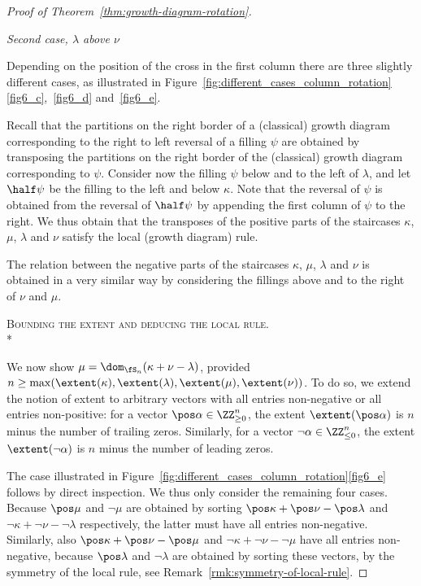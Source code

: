 \begin{proof}[Proof of Theorem~\ref{thm:growth-diagram-rotation}]
\begin{enonce*}[remark]{\emph{Second case, $\lambda$ above $\nu$}}\ 

 Depending on the position of the cross in the first column there
 are three slightly different cases, as illustrated in
 Figure~\ref{fig:different_cases_column_rotation}\ref{fig6_c},~\ref{fig6_d} and~\ref{fig6_e}.

 Recall that the partitions on the right border of a (classical)
 growth diagram corresponding to the right to left reversal of a
 filling $\psi$ are obtained by transposing the partitions on the
 right border of the (classical) growth diagram corresponding to
 $\psi$. Consider now the filling $\psi$ below and to the left of
 $\lambda$, and let $\half\psi$ be the filling to the left and below
 $\kappa$. Note that the reversal of $\psi$ is obtained from the
 reversal of $\half\psi$ by appending the first column of $\psi$ to
 the right. We thus obtain that the transposes of the positive
 parts of the staircases $\kappa$, $\mu$, $\lambda$ and $\nu$
 satisfy the local (growth diagram) rule.

 The relation between the negative parts of the staircases $\kappa$,
 $\mu$, $\lambda$ and $\nu$ is obtained in a very similar way by
 considering the fillings above and to the right of $\nu$ and $\mu$.
\end{enonce*}

\noindent
\textsc{Bounding the extent and deducing the local rule.}\\*\vspace*{-1.1em}

 We now show
 $\mu = \dom_{\fS_n}(\kappa+\nu-\lambda)$, provided
 $n\geq\max(\extent(\kappa),\extent(\lambda),\extent(\mu),\extent(\nu))$.
 To do so, we extend the notion of extent to arbitrary vectors with
 all entries non-negative or all entries non-positive: for a vector
 $\pos\alpha\in\ZZ_{\geq0}^n$, the extent $\extent(\pos\alpha)$ is
 $n$ minus the number of trailing zeros. Similarly, for a vector
 $\neg\alpha\in\ZZ_{\leq0}^n$, the extent $\extent(\neg\alpha)$ is
 $n$ minus the number of leading zeros.

 The case illustrated in
 Figure~\ref{fig:different_cases_column_rotation}\ref{fig6_e} follows by
 direct inspection. We thus only consider the remaining four cases.
 Because $\pos\mu$ and $\neg\mu$ are obtained by sorting
 $\pos\kappa+\pos\nu-\pos\lambda$ and
 $\neg\kappa+\neg\nu-\neg\lambda$ respectively, the latter must have
 all entries non-negative. Similarly, also
 $\pos\kappa+\pos\nu-\pos\mu$ and $\neg\kappa+\neg\nu-\neg\mu$ have
 all entries non-negative, because $\pos\lambda$ and $\neg\lambda$
 are obtained by sorting these vectors, by the symmetry of the local
 rule, see Remark~\ref{rmk:symmetry-of-local-rule}.


\end{proof}
